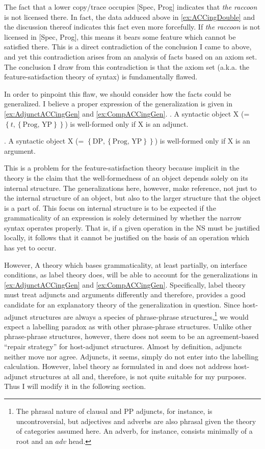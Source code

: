 \documentclass[MilwayThesis]{subfiles}
\begin{document}
The fact that a lower copy/trace occupies [Spec, Prog] indicates that \textit{the raccoon} is not licensed there.
In fact, the data adduced above in \cref{ex:ACCingDouble} and the discussion thereof indicates this fact even more forcefully.
If \textit{the raccoon} is not licensed in [Spec, Prog], this means it bears some feature which cannot be satisfied there.
This is a direct contradiction of the conclusion I came to above, and yet this contradiction arises from an analysis of facts based on an axiom set.
The conclusion I draw from this contradiction is that the axiom set (a.k.a. the feature-satisfaction theory of syntax) is fundamentally flawed.

In order to pinpoint this flaw, we should consider how the facts could be generalized.
I believe a proper expression of the generalization is given in \cref{ex:AdjunctACCingGen} and \cref{ex:CompACCingGen}.
\ex. A syntactic object X (= $\left\{ t, \left\{ \text{Prog, YP}  \right\} \right\}$) is well-formed only if X is an adjunct.\label{ex:AdjunctACCingGen}

\ex. A syntactic object X (= $\left\{ \text{DP}, \left\{ \text{Prog, YP}  \right\} \right\}$) is well-formed only if X is an argument.\label{ex:CompACCingGen}

This is a problem for the feature-satisfaction theory because implicit in the theory is the claim that the well-formedness of an object depends solely on its internal structure.
The generalizations here, however, make reference, not just to the internal structure of an object, but also to the larger structure that the object is a part of.
This focus on internal structure is to be expected if the grammaticality of an expression is solely determined by whether the narrow syntax operates properly.
That is, if a given operation in the NS must be justified locally, it follows that it cannot be justified on the basis of an operation which has yet to occur.

However, A theory which bases grammaticality, at least partially, on interface conditions, as label theory does, will be able to account for the generalizations in \cref{ex:AdjunctACCingGen} and \cref{ex:CompACCingGen}.
Specifically, label theory must treat adjuncts and arguments differently and therefore, provides a good candidate for an explanatory theory of the generalization in question.
Since host-adjunct structures are always a species of phrase-phrase structures,\footnote{
	The phrasal nature of clausal and PP adjuncts, for instance, is uncontroversial, but adjectives and adverbs are also phrasal given the theory of categories assumed here.
	An adverb, for instance, consists minimally of a root and an $adv$ head.
}
we would expect a labelling paradox as with other phrase-phrase structures.
Unlike other phrase-phrase structures, however, there does not seem to be an agreement-based ``repair strategy'' for host-adjunct structures.
Almost by definition, adjuncts neither move nor agree. 
Adjuncts, it seems, simply do not enter into the labelling calculation.
However, label theory as formulated in \cite{chomsky2013problems} and \cite{chomsky2015problems} does not address host-adjunct structures at all and, therefore, is not quite suitable for my purposes.
Thus I will modify it in the following section.
\end{document}
